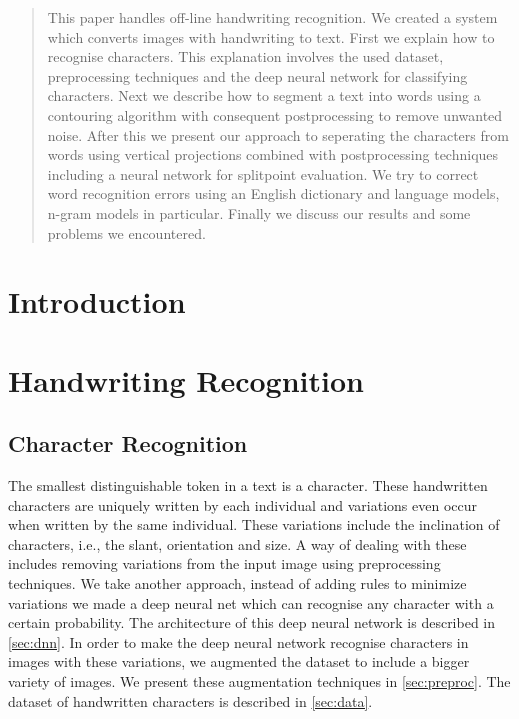 \documentclass{article}
\begin{document}
 

\begin{abstract} 
This paper handles off-line handwriting recognition. We created a system which converts images with handwriting to text. 
First we explain how to recognise characters. This explanation involves the used dataset, preprocessing techniques and the deep neural network for classifying characters. 
Next we describe how to segment a text into words using a contouring algorithm with consequent postprocessing to remove unwanted noise. 
After this we present our approach to seperating the characters from words using vertical projections combined with postprocessing techniques including a neural network for splitpoint evaluation. 
We try to correct word recognition errors using an English dictionary and language models, n-gram models in particular.
Finally we discuss our results and some problems we encountered.

\end{abstract} 

\section{Introduction}
\section{Handwriting Recognition}

\subsection{Character Recognition}
The smallest distinguishable token in a text is a character. These handwritten characters are uniquely 
written by each individual and variations even occur when written by the same individual. These variations include the inclination of characters, i.e., the slant, orientation and size. 
A way of dealing with these includes removing variations from the input image using preprocessing techniques. 
We take another approach, instead of adding rules to minimize variations we made a deep neural net which can recognise any character with a certain probability. The architecture of this deep neural network is described in \ref{sec:dnn}. 
In order to make the deep neural network recognise characters in images with these variations, we augmented the dataset to include a bigger variety of images. We present these augmentation techniques in \ref{sec:preproc}. 
The dataset of handwritten characters is described in \ref{sec:data}.
\end{document}
